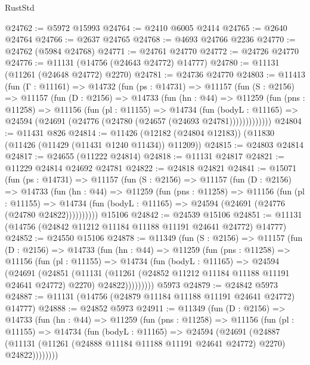 \begin{lexlean}{RustStd}
\begin{coremodule}
@24762 := @5972 @15993
@24764 := @2410 @6005 @2414
@24765 := @2640 @24764
@24766 := @2637 @24765
@24768 := @4693 @24766 @2236
@24770 := @24762 (@5984 @24768)
@24771 := @24761 @24770
@24772 := @24726 @24770
@24776 := @11131 (@14756 (@24643 @24772) @14777)
@24780 := @11131 (@11261 (@24648 @24772) @2270)
@24781 := @24736 @24770
@24803 := @11413
    (fun (Γ : @11161) =>
    @14732
      (fun (ps : @14731) =>
      @11157
        (fun (S : @2156) =>
        @11157
          (fun (D : @2156) =>
          @14733
            (fun (hn : @44) =>
            @11259
              (fun (pns : @11258) =>
              @11156
                (fun (pl : @11155) =>
                @14734
                  (fun (bodyL : @11165) =>
                  @24594 (@24691 (@24776 (@24780 (@24657 (@24693 @24781)))))))))))))
@24804 := @11431 @826
@24814 := @11426 (@12182 (@24804 @12183)) (@11830 (@11426 (@11429 (@11431 @1240 @11434)) @11209))
@24815 := @24803 @24814
@24817 := @24655 (@11222 @24814)
@24818 := @11131 @24817
@24821 := @11229 @24814 @24692 @24781
@24822 := @24818 @24821
@24841 := @15071
    (fun (ps : @14731) =>
    @11157
      (fun (S : @2156) =>
      @11157
        (fun (D : @2156) =>
        @14733
          (fun (hn : @44) =>
          @11259
            (fun (pns : @11258) =>
            @11156
              (fun (pl : @11155) =>
              @14734 (fun (bodyL : @11165) => @24594 (@24691 (@24776 (@24780 @24822))))))))))
    @15106
@24842 := @24539 @15106
@24851 := @11131 (@14756 (@24842 @11212 @11184 @11188 @11191 @24641 @24772) @14777)
@24852 := @24550 @15106
@24878 := @11349
    (fun (S : @2156) =>
    @11157
      (fun (D : @2156) =>
      @14733
        (fun (hn : @44) =>
        @11259
          (fun (pns : @11258) =>
          @11156
            (fun (pl : @11155) =>
            @14734
              (fun (bodyL : @11165) =>
              @24594
                (@24691
                  (@24851
                    (@11131
                      (@11261 (@24852 @11212 @11184 @11188 @11191 @24641 @24772) @2270)
                      @24822)))))))))
    @5973
@24879 := @24842 @5973
@24887 := @11131 (@14756 (@24879 @11184 @11188 @11191 @24641 @24772) @14777)
@24888 := @24852 @5973
@24911 := @11349
    (fun (D : @2156) =>
    @14733
      (fun (hn : @44) =>
      @11259
        (fun (pns : @11258) =>
        @11156
          (fun (pl : @11155) =>
          @14734
            (fun (bodyL : @11165) =>
            @24594
              (@24691
                (@24887
                  (@11131 (@11261 (@24888 @11184 @11188 @11191 @24641 @24772) @2270) @24822))))))))

\end{coremodule}
\end{lexlean}
